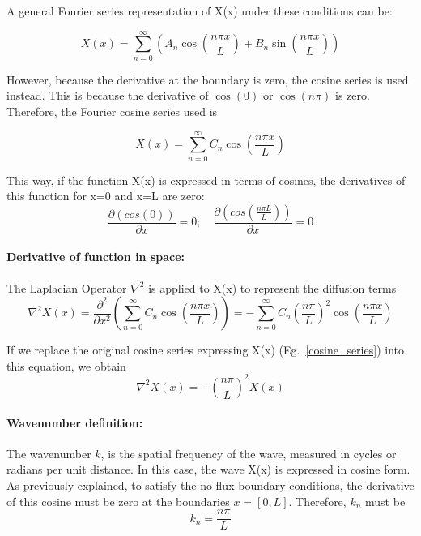 A general Fourier series representation of X(x) under these conditions can be:

\begin{equation}
    X(x) = \sum_{n=0}^{\infty} \left( A_n \cos\left(\frac{n \pi x}{L}\right) + B_n \sin\left(\frac{n \pi x}{L}\right) \right)
\end{equation}

However, because the derivative at the boundary is zero, the cosine series is used instead.
This is because the derivative of $\cos(0)$ or $\cos(n\pi)$ is zero.
Therefore, the Fourier cosine series used is

\begin{equation}
    X(x) = \sum_{n=0}^{\infty}  C_n \cos\left(\frac{n \pi x}{L}\right)
    \label{cosine_series}
\end{equation}

This way, if the function X(x) is expressed in terms of cosines, the derivatives of this function for x=0 and x=L are zero:
\begin{equation}
    \frac{\partial \left(cos(0)\right)}{\partial x} = 0 ; \quad \frac{\partial \left(cos(\frac{n \pi L}{L})\right)}{\partial x} = 0
    \end{equation}

\paragraph{Derivative of function in space:}
The Laplacian Operator $\nabla^2$ is applied to X(x) to represent the diffusion terms
\begin{equation}
    \nabla^2 X(x) = \frac{\partial^2}{\partial x^2} \left(\sum_{n=0}^{\infty}  C_n \cos\left(\frac{n \pi x}{L}\right) \right)  = - \sum_{n=0}^{\infty}  C_n \left(\frac{n \pi }{L}\right)^2 \cos\left(\frac{n \pi x}{L}\right)
\end{equation}

If we replace the original cosine series expressing X(x) (Eg.~\ref{cosine_series}) into this equation, we obtain
\begin{equation}
    \nabla^2 X(x) = -\left(\frac{n \pi }{L}\right)^2 X(x)
\end{equation}


\paragraph{Wavenumber definition:}
The wavenumber $k$, is the spatial frequency of the wave, measured in cycles or radians per unit distance.
In this case, the wave X(x) is expressed in cosine form.
As previously explained, to satisfy the no-flux boundary conditions, the derivative of this cosine must be zero at the boundaries $x=[0,L]$.
Therefore, $k_{n}$ must be
\begin{equation}
    k_{n}=\frac{n \pi}{L}
\end{equation}

